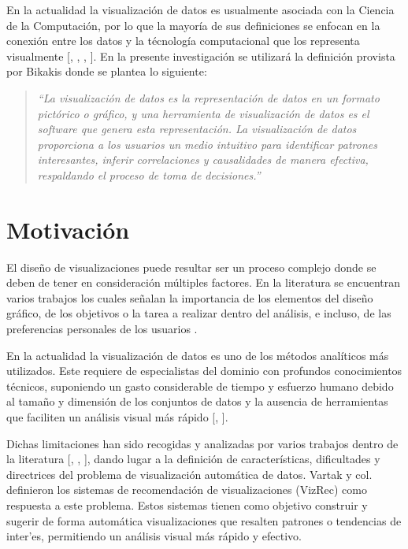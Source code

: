 En la actualidad la visualizaci\'on de datos
es usualmente asociada con la Ciencia de la Computaci\'on, por lo que la mayor\'ia
de sus definiciones se enfocan en la conexi\'on entre los datos y la t\'ecnolog\'ia
computacional que los representa visualmente 
[\cite*{card1999readings}, \cite*{friendly2001milestones}, \cite*{manovich2010visualization}, \cite*{kirk2012data}].
En la presente investigaci\'on se utilizar\'a la definici\'on provista por
Bikakis \cite{bikakis2018big} donde se plantea lo siguiente:\\
\begin{quotation}
    \textit{``La visualizaci\'on de datos es la representación de datos en un
    formato pictórico o gráfico, y una herramienta de visualización de
    datos es el software que genera esta representación. La visualización
    de datos proporciona a los usuarios un medio intuitivo para identificar patrones
    interesantes, inferir correlaciones y causalidades de manera efectiva,
    respaldando el proceso de toma de decisiones.''}
\end{quotation}


\section*{Motivaci\'on}

El dise\~no de visualizaciones puede resultar ser un proceso complejo 
donde se deben de tener en consideraci\'on m\'ultiples factores. 
En la literatura se encuentran varios trabajos los cuales se\~nalan la importancia
de los elementos del dise\~no gr\'afico,
de los objetivos o la tarea a realizar dentro del an\'alisis, e incluso, de las
preferencias personales de los usuarios \cite{zeng2021we}.

En la actualidad la visualizaci\'on de datos es uno de los m\'etodos
anal\'iticos m\'as utilizados. Este requiere de especialistas
del dominio con profundos conocimientos t\'ecnicos, suponiendo un gasto
considerable de tiempo y esfuerzo humano debido al tama\~no y dimensi\'on
de los conjuntos de datos y la ausencia de herramientas que faciliten un
an\'alisis visual m\'as r\'apido [\cite*{chen2012business}, \cite*{vartak2017towards}].

Dichas limitaciones han sido recogidas y analizadas por varios trabajos dentro de la
literatura [\cite*{zeng2021we}, \cite*{vartak2017towards}, \cite*{godfrey2016interactive}], 
dando lugar a la definici\'on de caracter\'isticas, dificultades y 
directrices del problema de visualizaci\'on autom\'atica de datos.
Vartak y col. \cite{vartak2017towards} definieron los sistemas de recomendaci\'on
de visualizaciones (VizRec) como respuesta a este problema. Estos sistemas tienen como
objetivo construir y sugerir de forma autom\'atica visualizaciones que resalten
patrones o tendencias de inter'es, permitiendo un an\'alisis visual m\'as r\'apido
y efectivo.

